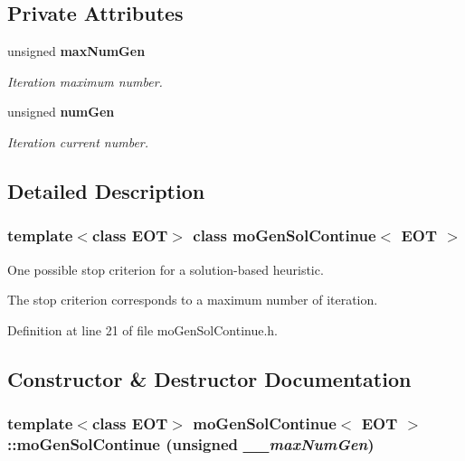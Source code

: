 \subsection*{Private Attributes}
\begin{CompactItemize}
\item 
unsigned {\bf max\-Num\-Gen}\label{classmo_gen_sol_continue_6d7674fc51d17423e8ee28693a08b5af}

\begin{CompactList}\small\item\em Iteration maximum number. \item\end{CompactList}\item 
unsigned {\bf num\-Gen}\label{classmo_gen_sol_continue_a18ebfd270f96517b4edaa2cad3eb9e0}

\begin{CompactList}\small\item\em Iteration current number. \item\end{CompactList}\end{CompactItemize}


\subsection{Detailed Description}
\subsubsection*{template$<$class EOT$>$ class mo\-Gen\-Sol\-Continue$<$ EOT $>$}

One possible stop criterion for a solution-based heuristic. 

The stop criterion corresponds to a maximum number of iteration. 



Definition at line 21 of file mo\-Gen\-Sol\-Continue.h.

\subsection{Constructor \& Destructor Documentation}
\subsubsection{\setlength{\rightskip}{0pt plus 5cm}template$<$class EOT$>$ {\bf mo\-Gen\-Sol\-Continue}$<$ EOT $>$::{\bf mo\-Gen\-Sol\-Continue} (unsigned {\em \_\-\_\-max\-Num\-Gen})\hspace{0.3cm}{\tt  [inline]}}\label{classmo_gen_sol_continue_6b6cab23a23bd8904ea52ef5141d8d0a}


